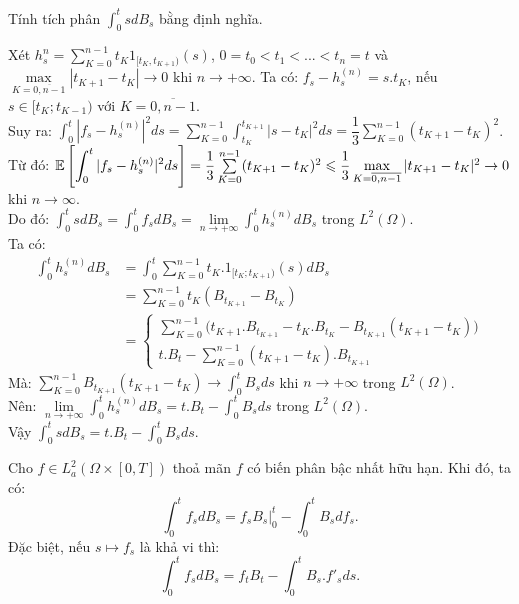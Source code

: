 \begin{exam*}
Tính tích phân $\displaystyle \int_0^t s dB_s$ bằng định nghĩa.
\begin{sol*} Xét $h_s^{n} = \sum\limits_{K=0}^{n-1}t_K 1_{[t_K,t_{K+1})}(s)$, $0=t_0<t_1<...<t_n=t$ và $ \max\limits_{K=\overline{0, n-1}}|t_{K+1}-t_K|\rightarrow 0$ khi $n\rightarrow +\infty$. Ta có: $f_s - h_s^{(n)}= s.t_K$, nếu $s \in [t_K; t_{K-1})$ với $K=\overline{0,n-1}$.\\ Suy ra: $\displaystyle \int_0^t|f_s-h_s^{(n)}|^2ds = \displaystyle\sum\limits_{K=0}^{n-1}\displaystyle \int_{t_K}^{t_{K+1}}|s-t_K|^2ds = \dfrac{1}{3}\displaystyle\sum\limits_{K=0}^{n-1}(t_{K+1}-t_K)^2$.\\ Từ đó: $\mathbb{E}\left[\displaystyle \int_0^t|f_s - h_s^{(n)}|^2ds\right]=\dfrac{1}{3}\sum\limits_{K=0}^{n-1}(t_{K+1}-t_K)^2\leqslant \dfrac{1}{3}\max\limits_{K=\overline{0,n-1}}|t_{K+1}-t_K|^2\to 0$ khi $n\to \infty$.\\ Do đó: $\displaystyle \int_0^tsdB_s = \displaystyle \int_0^tf_sdB_s = \lim\limits_{n\to +\infty}\displaystyle \int_0^th_s^{(n)}dB_s$ trong $L^2(\Omega)$.\\ Ta có: 
\begin{align*}
    \displaystyle \int_0^th_s^{(n)}dB_s&= \displaystyle \int_0^t\sum\limits_{K=0}^{n-1}t_K.1_{[t_K; t_{K+1})}(s)dB_s\\
    &= \sum\limits_{K=0}^{n-1}t_K(B_{t_{K+1}}-B_{t_K})\\
    &= \left \{ \begin{matrix} \displaystyle\sum\limits_{K=0}^{n-1}\big(t_{K+1}.B_{t_{K+1}}-t_K.B_{t_K}-B_{t_{K+1}}(t_{K+1}-t_K)\big)\\ t.B_t-\sum\limits_{K=0}^{n-1}(t_{K+1}-t_K).B_{t_{K+1}}
    \end{matrix}\right.
\end{align*}
Mà: $\displaystyle\sum\limits_{K=0}^{n-1}B_{t_{K+1}}(t_{K+1}-t_K)\longrightarrow \displaystyle \int_0^tB_sds$ khi $n\to +\infty$ trong $L^2(\Omega)$.\\ Nên: $\lim\limits_{n\to +\infty}\displaystyle \int_0^th_s^{(n)}dB_s=t.B_t- \displaystyle \int_0^tB_sds$ trong $L^2(\Omega)$.\\ Vậy $\displaystyle \int_0^tsdB_s = t.B_t - \displaystyle \int_0^t B_sds$.
\end{sol*}
\end{exam*}
\begin{thm} Cho $f\in L_a^2(\Omega\times[0, T])$ thoả mãn $f$ có biến phân bậc nhất hữu hạn. Khi đó, ta có: \[\displaystyle \int_0^tf_sdB_s = f_sB_s\Big|_0^t - \displaystyle \int_0^tB_sdf_s.\] Đặc biệt, nếu $s\mapsto f_s$ là khả vi thì: \[\displaystyle \int_0^tf_sdB_s = f_tB_t - \displaystyle \int_0^tB_s.f'_sds.\]    
\end{thm}
